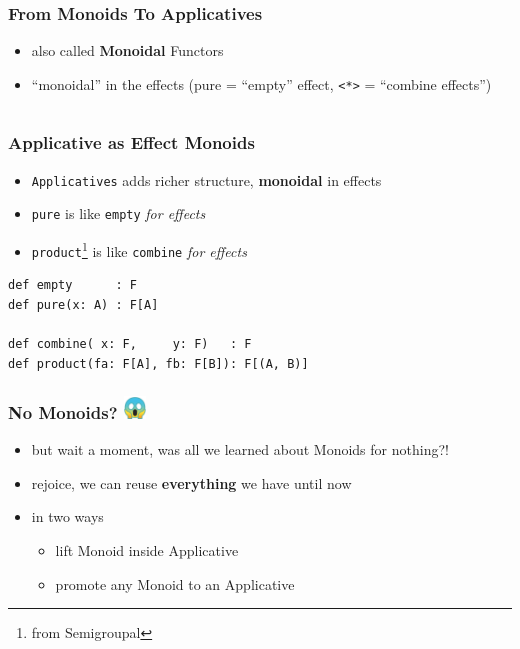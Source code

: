\documentclass[aspectratio=169]{beamer}
\begin{document}
\begin{frame}[fragile]
  \frametitle{From Monoids To Applicatives}
  \begin{itemize}
  \item also called \textbf{Monoidal} Functors
  \item ``monoidal'' in the effects (pure = ``empty'' effect, \texttt{<*>} = ``combine effects'')
  \end{itemize}
  \vspace{5mm}
  \inputminted[fontsize=\small]{scala}{snippets/applicative-def.scala}
\end{frame}

\begin{frame}[fragile]
  \frametitle{Applicative as Effect Monoids}
  \begin{itemize}
  \item \texttt{Applicatives} adds richer structure, \textbf{monoidal} in effects
  \item \texttt{pure} is like \texttt{empty} \textit{for effects}
  \item \texttt{product}\footnote{from Semigroupal} is like \texttt{combine} \textit{for effects}
  \end{itemize}
  \begin{verbatim}
def empty      : F
def pure(x: A) : F[A]

def combine( x: F,     y: F)   : F
def product(fa: F[A], fb: F[B]): F[(A, B)]
  \end{verbatim}
\end{frame}

\begin{frame}
  \frametitle{No Monoids? \includegraphics[width=6mm, valign=c]{static-images/scream.png}}
  \begin{itemize}
  \item but wait a moment, was all we learned about Monoids for nothing?!
  \item rejoice, we can reuse \textbf{everything} we have until now
  \item in two ways
    \begin{itemize}
    \item lift Monoid inside Applicative
    \item promote any Monoid to an Applicative
    \end{itemize}
  \end{itemize}
\end{frame}
\end{document}

